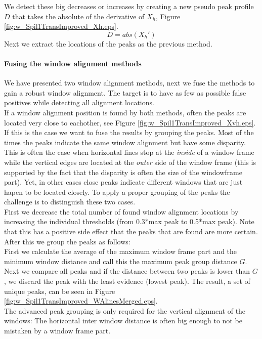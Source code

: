 We detect these big decreases or increases by creating a new pseudo peak profile
$D$ that takes the absolute of the derivative of $X_h$, Figure \ref{fig:w_Spil1TransImproved_Xh.eps}.
\[D = abs( X_{h}')\]
Next we extract the locations of the peaks as the previous method.

\paragraph{Fusing the window alignment methods}
We have presented two window alignment methods, next we fuse the methods to
gain a robust window alignment.
The target is to have as few as possible false positives while detecting all alignment locations.\\

If a window alignment position is found by both methods, often the peaks are
located very close to eachother, see Figure
\ref{fig:w_Spil1TransImproved_Xvh.eps}.  If this is the case we want to fuse the results by grouping the peaks.
Most of the times the peaks indicate the same window alignment but have
some disparity.  This is often the case when horizontal lines stop at the \emph{inside}
of a window frame while the vertical edges are located at the \emph{outer} side of the
window frame (this is supported by the fact that the disparity is often the size of the windowframe part).  
Yet, in other cases close peaks indicate different windows that are just hapen to be
located closely.  To apply a proper grouping of the peaks the challenge is to
distinguish these two cases.\\

First we decrease the total number of found window alignment locations by increasing the individual thresholds (from 0.3*max
peak to 0.5*max peak). Note that this has a positive side effect that the peaks that are found are more certain.
After this we group the peaks as follows: \\
First we calculate the average of the maximum window frame part and the minimum window
distance and call this the maximum peak group distance $G$.
Next we compare all peaks and if the distance between two peaks is lower than
$G$, we discard the peak with the least evidence (lowest peak). The result,
a set of unique peaks, can be seen in Figure \ref{fig:w_Spil1TransImproved_WAlinesMerged.eps}.\\

The advanced peak grouping is only required for the vertical alignment
of the windows: The horizontal inter window distance is often big enough to not
be mistaken by a window frame part.

